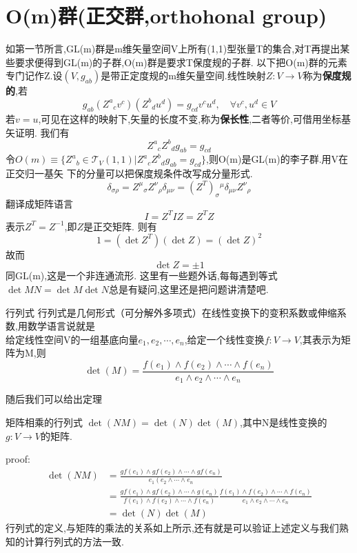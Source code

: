\documentclass[../main.tex]{subfiles}
\begin{document}
 \section{O(m)群(正交群,orthohonal group)}
 如第一节所言,GL(m)群是m维矢量空间V上所有(1,1)型张量T的集合,对T再提出某些要求便得到GL(m)的子群,O(m)群是要求T保度规的子群.
 以下把O(m)群的元素专门记作Z.设$(V,g_{ab})$是带正定度规的m维矢量空间.线性映射$Z:V \rightarrow V$称为\textbf{保度规的},若
 $$g_{ab}(Z^a{}_cv^c)(Z^b{}_du^d) = g_{cd}v^cu^d,\quad \forall v^c,u^d \in V$$
 若$v=u$,可见在这样的映射下,矢量的长度不变,称为\textbf{保长性},二者等价,可借用坐标基矢证明.
 我们有\begin{equation*}
     Z^a{}_cZ^b{}_d g_{ab}=g_{cd}
 \end{equation*}
 令$O(m)\equiv \{Z^a{}_b\in\mathscr{T}_V(1,1)|Z^a{}_cZ^b{}_d g_{ab}=g_{cd}\}$,则O(m)是GL(m)的李子群.用V在正交归一基矢
 下的分量可以把保度规条件改写成分量形式.
 $$\delta_{\sigma \rho} = Z^{\mu}{}_{\sigma}Z^{\nu}{}_{\rho}\delta_{\mu \nu} = (Z^T)_{\sigma}{}^{\mu}\delta_{\mu\nu}Z^{\nu}{}_{\rho}$$
 翻译成矩阵语言 $$ I = Z^{T}IZ = Z^TZ$$
 表示$Z^T= Z^{-1}$,即$Z$是正交矩阵.
 则有$$1=(\det Z^T)(\det Z) = (\det Z)^2$$
 故而$$\det Z = \pm 1$$同GL(m),这是一个非连通流形.
 这里有一些题外话,每每遇到等式$\det{MN} = \det{M}\det{N}$总是有疑问,这里还是把问题讲清楚吧.
 \begin{definition}{}{行列式}
     行列式是几何形式（可分解外多项式）在线性变换下的变积系数或伸缩系数,用数学语言说就是\\
     给定线性空间V的一组基底向量$e_1,e_2,\cdots,e_n$,给定一个线性变换$f:V\rightarrow V$,其表示为矩阵为M,则
     $$\det(M) = \frac{f(e_1)\wedge f(e_2) \wedge \cdots \wedge f(e_n)}{e_1 \wedge e_2\wedge \cdots \wedge e_n}$$
 \end{definition}
 随后我们可以给出定理
 \begin{theorem}{}{矩阵相乘的行列式}
     $\det(NM) = \det(N)\det(M)$,其中N是线性变换的$g:V\rightarrow V$的矩阵.
 \end{theorem}
 proof:\begin{align*}
 \det(N M)&=\frac{g f\left(e_{1}\right) \wedge g f\left(e_{2}\right) \wedge \cdots \wedge g f\left(e_{n}\right)}{e_{1}\left(e_{2} \wedge \cdots \wedge e_{n}\right.} \\
 &=\frac{g f\left(e_{1}\right) \wedge g f\left(e_{2}\right) \wedge \cdots  \wedge g\left(e_{n}\right)}{f\left(e_{1}\right) \wedge f\left(e_{2}\right) \wedge \cdots \wedge f\left(e_{n}\right)} \frac{f\left(e_{1}\right) \wedge f\left(e_{2}\right) \wedge \cdots \wedge f\left(e_{n}\right)}{e_{1} \wedge e_{2} \wedge \cdots \wedge e_{n}} \\
 &=\det(N) \det(M)
 \end{align*}
 行列式的定义,与矩阵的乘法的关系如上所示,还有就是可以验证上述定义与我们熟知的计算行列式的方法一致.
\end{document}
